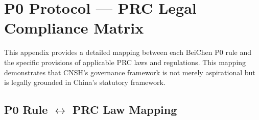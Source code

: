 
\section{P0 Protocol — PRC Legal Compliance Matrix}
\label{app:p0-law}

This appendix provides a detailed mapping between each BeiChen P0
rule and the specific provisions of applicable PRC laws and regulations.
This mapping demonstrates that CNSH's governance framework is not
merely aspirational but is legally grounded in China's statutory
framework.

\subsection{P0 Rule $\leftrightarrow$ PRC Law Mapping}

